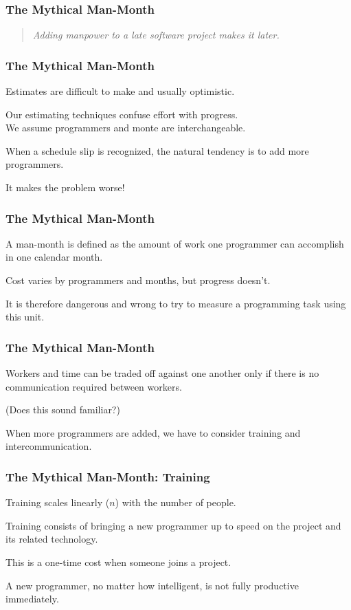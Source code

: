 \begin{frame}
\frametitle{The Mythical Man-Month}
\begin{changemargin}{0.1cm}

\begin{quote}
	\textit{Adding manpower to a late software project makes it later.}
\end{quote}
\end{changemargin}
\end{frame}

\begin{frame}
\frametitle{The Mythical Man-Month}
\begin{changemargin}{1cm}
Estimates are difficult to make and usually optimistic.

Our estimating techniques confuse effort with progress.\\
We assume programmers and monte are interchangeable. 

When a schedule slip is recognized, the natural tendency is to add more programmers. 

It makes the problem worse! 
\end{changemargin}
\end{frame}

\begin{frame}
\frametitle{The Mythical Man-Month}
\begin{changemargin}{1cm}
A \alert{man-month} is defined as the amount of work one programmer can accomplish in one calendar month. 

Cost varies by programmers and months, but progress doesn't. 

It is therefore dangerous and wrong to try to measure a programming task using this unit.
\end{changemargin}
\end{frame}

\begin{frame}
\frametitle{The Mythical Man-Month}
\begin{changemargin}{1cm}
Workers and time can be traded off against one another only if there is no communication required between workers. 

(Does this sound familiar?) 

When more programmers are added, we have to consider training and intercommunication.
\end{changemargin}
\end{frame}

\begin{frame}
\frametitle{The Mythical Man-Month: Training}
\begin{changemargin}{1cm}
Training scales linearly ($n$) with the number of people. 

Training consists of bringing a new programmer up to speed on the project and its related technology. 

This is a one-time cost when someone joins a project. 

A new programmer, no matter how intelligent, is not fully productive immediately.
\end{changemargin}
\end{frame}

